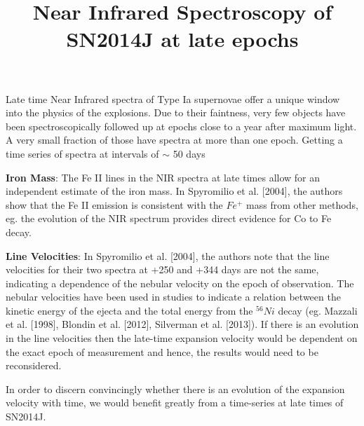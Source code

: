 \documentclass{article}
\begin{document}
\title{Near Infrared Spectroscopy of SN2014J at late epochs}
\maketitle
Late time Near Infrared spectra of Type Ia supernovae offer a unique window into the physics of the explosions. Due to their faintness, very few objects have been spectroscopically followed up at epochs close to a year after maximum light. A very small fraction of those have spectra at more than one epoch.
Getting a time series of spectra at intervals of $\sim$ 50 days 

\textbf{Iron Mass}:
The Fe II lines in the NIR spectra at late times allow for an independent estimate of the iron mass. In Spyromilio et al. [2004], the authors show that the Fe II emission is consistent with the $Fe^{+}$  mass from other methods, eg. 
the evolution of the NIR spectrum provides  direct evidence for Co to Fe decay. 

\textbf{Line Velocities}:
In Spyromilio et al. [2004], the authors note that the line velocities for their two spectra at +250 and +344 days are not the same, indicating a dependence of the nebular velocity on the epoch of observation. The nebular velocities have been used in studies to indicate a relation between the kinetic energy of the ejecta and the total energy from the $^{56} Ni$ decay (eg. Mazzali et al. [1998], Blondin et al. [2012], Silverman et al. [2013]). If there is an evolution in the line velocities then the late-time expansion velocity would be dependent on the exact epoch of measurement and hence, the results would need to be reconsidered. 

In order to discern convincingly whether there is an evolution of the expansion velocity with time, we would benefit greatly from a time-series at late times of SN2014J.  
\end{document}
